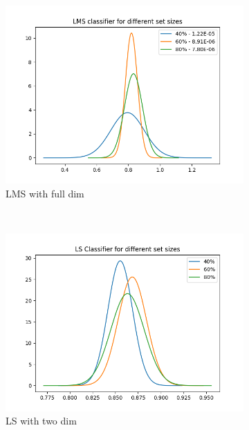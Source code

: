 \documentclass[12pt, a4paper]{article}
\begin{document}
\begin{figure}[H]
\begin{subfigure}{0.3\textwidth}
        \includegraphics[width=\textwidth]{recursos/1/lms_full}
        \caption{LMS with full dim}
    \end{subfigure}
    ~
    \begin{subfigure}{0.3\textwidth}
        \includegraphics[width=\textwidth]{recursos/1/ls_2}
        \caption{LS with two dim}
    \end{subfigure}
    \begin{subfigure}{0.3\textwidth}

\end{subfigure}
\end{figure}
\end{document}
